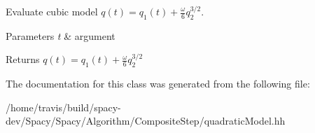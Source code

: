 \-Evaluate cubic model $ q(t) = q_1(t) + \frac{\omega}{6}q_2^{3/2} $. 


\begin{DoxyParams}{\-Parameters}
{\em t} & argument \\
\hline
\end{DoxyParams}
\begin{DoxyReturn}{\-Returns}
$ q(t) = q_1(t) + \frac{\omega}{6}q_2^{3/2} $ 
\end{DoxyReturn}


\-The documentation for this class was generated from the following file\-:\begin{DoxyCompactItemize}
\item 
/home/travis/build/spacy-\/dev/\-Spacy/\-Spacy/\-Algorithm/\-Composite\-Step/quadratic\-Model.\-hh\end{DoxyCompactItemize}
